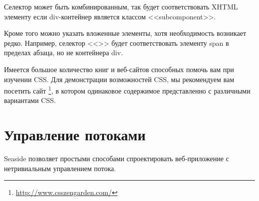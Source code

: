 \documentclass[a4paper,10pt,twoside]{book}
\begin{document}


Селектор может быть комбинированным, так 
будет соответствовать XHTML элементу если div-контейнер является
классом <<subcomponent>>. 


Кроме того можно указать вложенные элементы,
хотя необходимость возникает редко.
Например, селектор <<>> будет соответствовать элементу span
в пределах абзаца, но не контейнера div.


Имеется большое количество книг и веб-сайтов способных помочь вам
при изучении CSS.
Для демонстрации возможностей CSS,
мы рекомендуем вам посетить сайт \footnote{\url{http://www.csszengarden.com/}},
в котором одинаковое содержимое представленно с различными вариантами CSS.

\section{Управление потоками}


Seaside позволяет простыми способами спроектировать веб-приложение с
нетривиальным  управлением потока.
\end{document}
